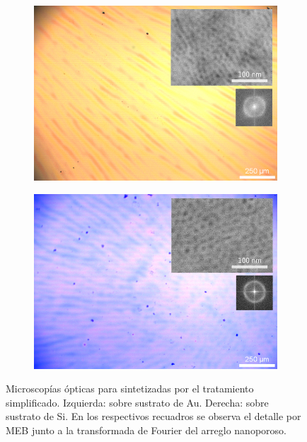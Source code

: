          \begin{figure}[th!]          
 	   	    \begin{subfigure}{0.495\textwidth}
	       	\includegraphics[width=\textwidth]{Imagenes/Au_EtF127-Combinada.jpg}
	   		\end{subfigure}
	   		\begin{subfigure}{0.495\textwidth}
	   	    \includegraphics[width=\textwidth]{Imagenes/Si_EtF127-Combinada.jpg}
	   		\end{subfigure}
			 \caption[Microscopías \pdmF\space tratamiento simplificado.]{Microscopías ópticas para \pdmF\space sintetizadas por el tratamiento simplificado. Izquierda: sobre sustrato de Au. Derecha: sobre sustrato de Si. En los respectivos recuadros se observa el detalle por MEB junto a la transformada de Fourier del arreglo nanoporoso.}

\end{figure}
